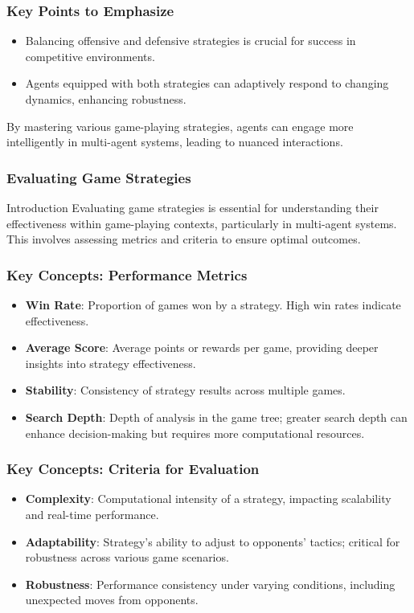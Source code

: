 \documentclass[aspectratio=169]{beamer}
\begin{document}
\begin{frame}[fragile]
    \frametitle{Key Points to Emphasize}
    \begin{itemize}
        \item Balancing offensive and defensive strategies is crucial for success in competitive environments.
        \item Agents equipped with both strategies can adaptively respond to changing dynamics, enhancing robustness.
    \end{itemize}
    By mastering various game-playing strategies, agents can engage more intelligently in multi-agent systems, leading to nuanced interactions.
\end{frame}

\begin{frame}
    \frametitle{Evaluating Game Strategies}
    \begin{block}{Introduction}
        Evaluating game strategies is essential for understanding their effectiveness within game-playing contexts, particularly in multi-agent systems. This involves assessing metrics and criteria to ensure optimal outcomes.
    \end{block}
\end{frame}

\begin{frame}
    \frametitle{Key Concepts: Performance Metrics}
    \begin{itemize}
        \item \textbf{Win Rate}: Proportion of games won by a strategy. High win rates indicate effectiveness.
        \item \textbf{Average Score}: Average points or rewards per game, providing deeper insights into strategy effectiveness.
        \item \textbf{Stability}: Consistency of strategy results across multiple games.
        \item \textbf{Search Depth}: Depth of analysis in the game tree; greater search depth can enhance decision-making but requires more computational resources.
    \end{itemize}
\end{frame}

\begin{frame}
    \frametitle{Key Concepts: Criteria for Evaluation}
    \begin{itemize}
        \item \textbf{Complexity}: Computational intensity of a strategy, impacting scalability and real-time performance.
        \item \textbf{Adaptability}: Strategy’s ability to adjust to opponents' tactics; critical for robustness across various game scenarios.
        \item \textbf{Robustness}: Performance consistency under varying conditions, including unexpected moves from opponents.
    \end{itemize}
\end{frame}
\end{document}

